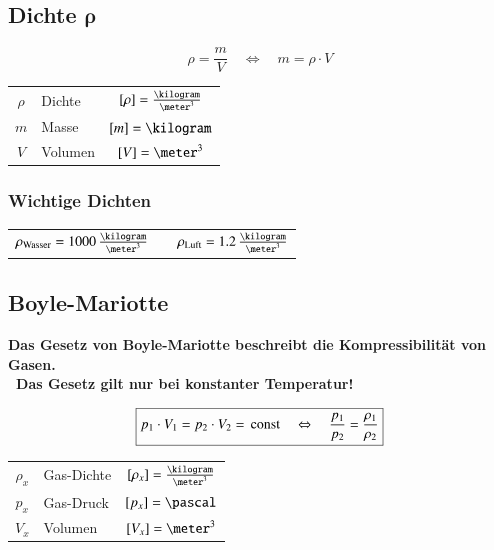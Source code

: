 \subsection[Dichte]{Dichte $\bm{\rho}$}


\begin{minipage}[c]{0.48\columnwidth}
    $$ \boxed{ \rho = \frac{m}{V} \quad \Leftrightarrow \quad m = \rho \cdot V } $$	 
\end{minipage}
\hfill
\begin{minipage}[c]{0.48\columnwidth}
    \begin{tabular}{c l c}
        $\rho$  & Dichte    & $[\rho] = \frac{\kilogram}{\meter^3}$ \\
        $m$     & Masse     & $[m] = \kilogram$    
                  \\
        $V$     & Volumen   & $[V] = \meter^3$
    \end{tabular}
\end{minipage}


\subsubsection{Wichtige Dichten}	

\begin{tabular}{l c l}
    $\rho_{\rm Wasser} = 1000 \, \frac{\kilogram}{\meter^3}$    & &  $\rho_{\rm Luft} = 1.2 \, \frac{\kilogram}{\meter^3}$
   
\end{tabular}


\subsection{Boyle-Mariotte}	
\textbf{Das Gesetz von Boyle-Mariotte beschreibt die Kompressibilität von Gasen.} \\
\textbf{ \textrightarrow\ Das Gesetz gilt nur bei konstanter Temperatur!} 

$$ \boxed{ p_1 \cdot V_1 = p_2 \cdot V_2 = \, \mathop{} \! \mathrm{const} \quad \Leftrightarrow \quad \frac{p_1}{p_2} = \frac{\rho_1}{\rho_2} } $$ 

\renewcommand{\arraystretch}{1.3}
\begin{tabular}{c l c}
    $\rho_x$    & Gas-Dichte    & $[\rho_x] = \frac{\kilogram}{\meter^3}$   \\
    $p_x$       & Gas-Druck     & $[p_x] = \pascal $                        \\
    $V_x$       & Volumen       & $[V_x] = \meter^3$
\end{tabular}
\renewcommand{\arraystretch}{1}


